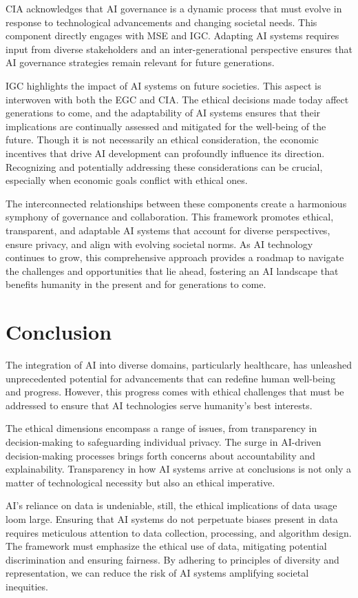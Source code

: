 \documentclass{article}
\begin{document}
CIA acknowledges that AI governance is a dynamic process that must evolve in response to technological advancements and changing societal needs. This component directly engages with MSE and IGC. Adapting AI systems requires input from diverse stakeholders and an inter-generational perspective ensures that AI governance strategies remain relevant for future generations.

IGC highlights the impact of AI systems on future societies. This aspect is interwoven with both the EGC and CIA. The ethical decisions made today affect generations to come, and the adaptability of AI systems ensures that their implications are continually assessed and mitigated for the well-being of the future. Though it is not necessarily an ethical consideration, the economic incentives that drive AI development can profoundly influence its direction. Recognizing and potentially addressing these considerations can be crucial, especially when economic goals conflict with ethical ones.

The interconnected relationships between these components create a harmonious symphony of governance and collaboration. This framework promotes ethical, transparent, and adaptable AI systems that account for diverse perspectives, ensure privacy, and align with evolving societal norms. As AI technology continues to grow, this comprehensive approach provides a roadmap to navigate the challenges and opportunities that lie ahead, fostering an AI landscape that benefits humanity in the present and for generations to come.

\section{Conclusion}
The integration of AI into diverse domains, particularly healthcare, has unleashed unprecedented potential for advancements that can redefine human well-being and progress. However, this progress comes with ethical challenges that must be addressed to ensure that AI technologies serve humanity's best interests.

The ethical dimensions encompass a range of issues, from transparency in decision-making to safeguarding individual privacy. The surge in AI-driven decision-making processes brings forth concerns about accountability and explainability. Transparency in how AI systems arrive at conclusions is not only a matter of technological necessity but also an ethical imperative.

AI's reliance on data is undeniable, still, the ethical implications of data usage loom large. Ensuring that AI systems do not perpetuate biases present in data requires meticulous attention to data collection, processing, and algorithm design. The framework
must emphasize the ethical use of data, mitigating potential discrimination and ensuring fairness. By adhering to principles of diversity and representation, we can reduce the risk of AI systems amplifying societal inequities.
\end{document}
